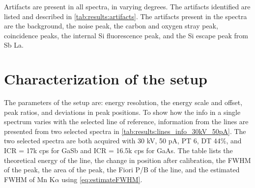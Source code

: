 
Artifacts are present in all spectra, in varying degrees.
The artifacts identified are listed and described in \cref{tab:results:artifacts}.
The artifacts present in the spectra are the background, the noise peak, the carbon and oxygen stray peak, coincidence peaks, the internal Si fluorescence peak, and the Si escape peak from Sb La.






























\section{Characterization of the setup}
\label{results:setup}

The parameters of the setup are: energy resolution, the energy scale and offset, peak ratios, and deviations in peak positions.
To show how the info in a single spectrum varies with the selected line of reference, information from the lines are presented from two selected spectra in \cref{tab:results:lines_info_30kV_50pA}.
The two selected spectra are both acquired with 30 kV, 50 pA, PT 6, DT 44\%, and ICR = 17k cps for GaSb and ICR = 16.5k cps for GaAs.
The table lists the theoretical energy of the line, the change in position after calibration, the FWHM of the peak, the area of the peak, the Fiori P/B of the line, and the estimated FWHM of Mn K$\alpha$ using \cref{eq:estimateFWHM}.


